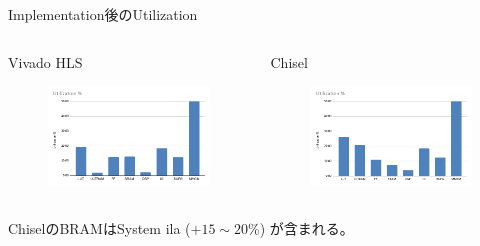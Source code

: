 \begin{frame}{Implementation後のUtilization}
\begin{columns}[t,onlytextwidth]
    \begin{column}{0.5\textwidth}
        Vivado HLS
        \begin{figure}
            \centering
            \includegraphics[width=\textwidth]{./figures/Utilization_hls.png}
        \end{figure}
    \end{column}
    \begin{column}{0.5\textwidth}
        Chisel
        \begin{figure}
            \centering
            \includegraphics[width=\textwidth]{./figures/Utilization_chisel.png}
        \end{figure}
    \end{column}
\end{columns}

ChiselのBRAMはSystem ila ($+15 \sim 20$\%) が含まれる。
    
\end{frame}


